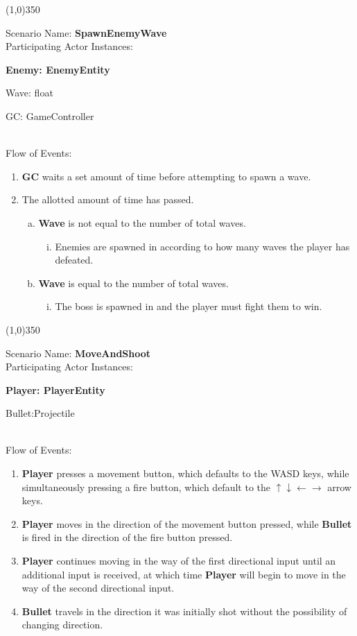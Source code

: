 \documentclass[12pt]{article}       %
\begin{document}
\begin{center} \line(1,0){350} \end{center}
Scenario Name: {\bf SpawnEnemyWave} \\
Participating Actor Instances:        \hspace{46pt} {\bf Enemy: EnemyEntity

						\hspace{2.6 in} Wave: float

					          \hspace{2.6 in}   GC: GameController}  \vspace{10pt}  \\ 
Flow of Events: 
\begin{enumerate} 
\item {\bf GC} waits a set amount of time before attempting to spawn a wave.
\item The allotted amount of time has passed.
	\begin{enumerate} [a.]
	\item {\bf Wave} is not equal to the number of total waves.
		\begin{enumerate} [i.]
		\item Enemies are spawned in according to how many waves the player has defeated.
		\end{enumerate}
	\item {\bf Wave} is equal to the number of total waves.
		\begin{enumerate} [i.]
		\item The boss is spawned in and the player must fight them to win.
		\end{enumerate}
	\end{enumerate}
\end{enumerate}

\begin{center} \line(1,0){350} \end{center}
Scenario Name: {\bf MoveAndShoot} \\
Participating Actor Instances:        \hspace{46pt} {\bf Player: PlayerEntity

					          \hspace{2.6 in}   Bullet:Projectile}  \vspace{10pt}  \\ 
Flow of Events: 
\begin{enumerate} 
\item {\bf Player} presses a movement button, which defaults to the WASD keys, while simultaneously pressing a fire button, which default to the $ \uparrow \downarrow \leftarrow \to $ arrow keys.
\item {\bf Player} moves in the direction of the movement button pressed, while {\bf Bullet} is fired in the direction of the fire button pressed.
\item {\bf Player} continues moving in the way of the first directional input until an additional input is received, at which time {\bf Player} will begin to move in the way of the second directional input. 
\item {\bf Bullet} travels in the direction it was initially shot without the possibility of changing direction.
\end{enumerate}
\end{document}
